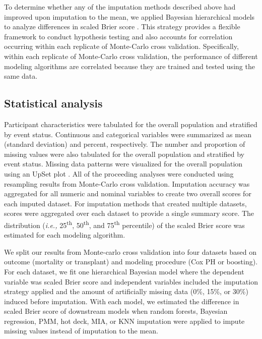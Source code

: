 \documentclass{article}
\begin{document}
To determine whether any of the imputation methods described above had
improved upon imputation to the mean, we applied Bayesian hierarchical
models to analyze differences in scaled Brier score
\cite{benavoli2017time}. This strategy provides a flexible framework to
conduct hypothesis testing and also accounts for correlation occurring
within each replicate of Monte-Carlo cross validation. Specifically,
within each replicate of Monte-Carlo cross validation, the performance
of different modeling algorithms are correlated because they are trained
and tested using the same data.

\hypertarget{statistical-analysis}{%
\subsection{Statistical analysis}\label{statistical-analysis}}

Participant characteristics were tabulated for the overall population
and stratified by event status. Continuous and categorical variables
were summarized as mean (standard deviation) and percent, respectively.
The number and proportion of missing values were also tabulated for the
overall population and stratified by event status. Missing data patterns
were visualized for the overall population using an UpSet plot
\cite{lex2014upset}. All of the proceeding analyses were conducted using
resampling results from Monte-Carlo cross validation. Imputation
accuracy was aggregated for all numeric and nominal variables to create
two overall scores for each imputed dataset. For imputation methods that
created multiple datasets, scores were aggregated over each dataset to
provide a single summary score. The distribution
(\textit{i.e., }25\textsuperscript{th}, 50\textsuperscript{th}, and
75\textsuperscript{th} percentile) of the scaled Brier score was
estimated for each modeling algorithm.

We split our results from Monte-carlo cross validation into four
datasets based on outcome (mortality or transplant) and modeling
procedure (Cox PH or boosting). For each dataset, we fit one
hierarchical Bayesian model where the dependent variable was scaled
Brier score and independent variables included the imputation strategy
applied and the amount of artificially missing data (0\%, 15\%, or 30\%)
induced before imputation. With each model, we estimated the difference
in scaled Brier score of downstream models when random forests, Bayesian
regression, PMM, hot deck, MIA, or KNN imputation were applied to impute
missing values instead of imputation to the mean.
\end{document}
